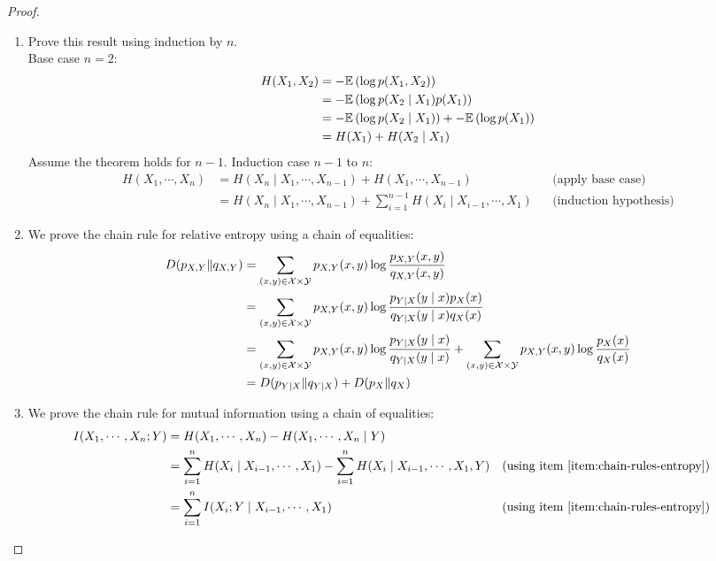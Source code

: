 \begin{proof}
    \begin{enumerate}
        \item 
            Prove this result using induction by $n$. \\
            Base case $n = 2$:
            \begin{align*}
                H(X_1, X_2) &= -\mathbb{E}\left(\log p(X_1, X_2)\right) \\
                &= -\mathbb{E}\left(\log p(X_2 \mid X_1)p(X_1)\right) \\
                &= -\mathbb{E}\left(\log p(X_2 \mid X_1)\right) + -\mathbb{E}\left(\log p(X_1)\right) \\
                &= H(X_1) + H(X_2 \mid X_1)
            \end{align*}
            Assume the theorem holds for $n - 1$. Induction case $n - 1$ to $n$:
            \begin{align*}
                H(X_1, \cdots, X_n) &= H(X_n \mid X_1, \cdots, X_{n-1}) + H(X_1, \cdots, X_{n-1})          && \text{(apply base case)} \\
                &= H(X_n \mid X_1, \cdots, X_{n-1}) + \sum_{i=1}^{n-1}{H(X_i \mid X_{i-1}, \cdots, X_1)}   && \text{(induction hypothesis)}
            \end{align*}

        \item
            We prove the chain rule for relative entropy using a chain of equalities:
            \begin{align*}
                D(p_{X,Y} \| q_{X,Y})
                    &= \sum_{(x, y) \in \mathcal{X} \times \mathcal{Y}}{p_{X,Y}(x, y) \log \frac{p_{X,Y}(x, y)}{q_{X,Y}(x, y)}} \\
                    &= \sum_{(x, y) \in \mathcal{X} \times \mathcal{Y}}{p_{X,Y}(x, y) \log \frac{p_{Y \mid X}(y \mid x)p_X(x)}{q_{Y \mid X}(y \mid x)q_X(x)}} \\
                    &= \sum_{(x, y) \in \mathcal{X} \times \mathcal{Y}}{p_{X,Y}(x, y) \log \frac{p_{Y \mid X}(y \mid x)}{q_{Y \mid X}(y \mid x)}}
                     + \sum_{(x, y) \in \mathcal{X} \times \mathcal{Y}}{p_{X,Y}(x, y) \log \frac{p_X(x)}{q_X(x)}} \\
                    &= D(p_{Y \mid X} \| q_{Y \mid X}) + D(p_X \| q_X)
            \end{align*}
        
        \item
            We prove the chain rule for mutual information using a chain of equalities:
            \begin{align*}
                I(X_1, \cdots, X_n; Y) &= H(X_1, \cdots, X_n) - H(X_1, \cdots, X_n \mid Y) \\
                &= \sum_{i=1}^{n}{H(X_i \mid X_{i-1}, \cdots, X_1)} - \sum_{i=1}^{n}{H(X_i \mid X_{i-1}, \cdots, X_1, Y)} && \text{(using item \ref{item:chain-rules-entropy})} \\
                &= \sum_{i=1}^{n}{I(X_i; Y \mid X_{i-1}, \cdots, X_1)}                                                                  && \text{(using item \ref{item:chain-rules-entropy})}
            \end{align*}


\end{enumerate}
\end{proof}
